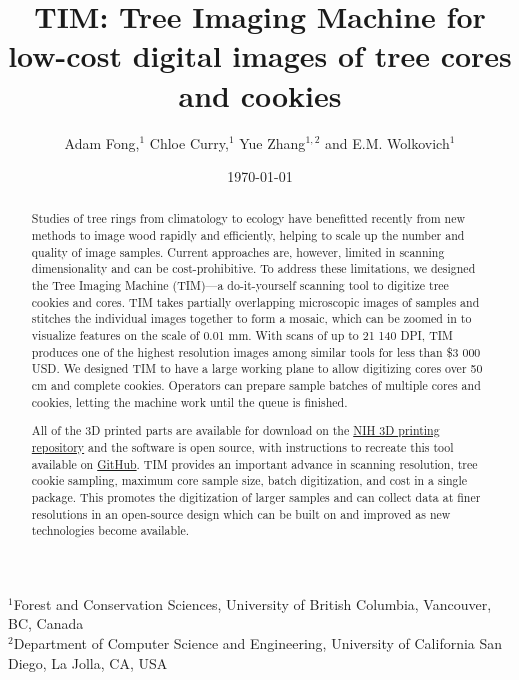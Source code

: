 \documentclass[a4paper,12pt]{article}
\title{TIM: Tree Imaging Machine for low-cost digital images of tree cores and cookies}
\author{Adam Fong,$^{1}$ Chloe Curry,$^{1}$ Yue Zhang$^{1, 2}$ and E.M. Wolkovich$^{1}$} %
\date{\today}
\begin{document}
\maketitle

\noindent $^{1}$Forest and Conservation Sciences, University of British Columbia, Vancouver, BC, Canada\\
$^{2}$Department of Computer Science and Engineering, University of California San Diego, La Jolla, CA, USA\\ 


\begin{abstract}  
Studies of tree rings from climatology to ecology have benefitted recently from new methods to image wood rapidly and efficiently, helping to scale up the number and quality of image samples. Current approaches are, however, limited in scanning dimensionality and can be cost-prohibitive. %
To address these limitations, we designed the Tree Imaging Machine (TIM)---a do-it-yourself scanning tool to digitize tree cookies and cores. TIM takes partially overlapping microscopic images of samples and stitches the individual images together to form 
a mosaic, which can be zoomed in to visualize features on the scale of 0.01 mm. With scans of up to 21 140 DPI, TIM produces one of the highest resolution images among similar tools for less than \$3 000 USD.
We designed TIM to have a large working plane to allow digitizing cores over 50 cm and complete cookies. Operators can prepare sample batches of multiple cores and cookies, letting the machine work until the queue is finished.

All of the 3D printed parts are available for download on the \href{https://doi.org/10.60705/3DPX/21561.3}{NIH 3D printing repository} and the software is  %
open source, with instructions to recreate this tool available on \href{https://github.com/temporalecologylab/TreeRings}{GitHub}. TIM provides an important advance in scanning resolution, tree cookie sampling, maximum core sample size, batch digitization, and cost in a single package. This promotes the digitization of larger samples and can collect data at finer resolutions in an open-source design which can be built on and improved as new technologies become available. %
\end{abstract}
\end{document}
